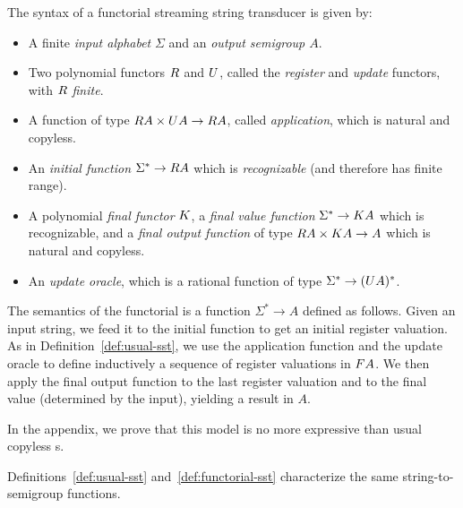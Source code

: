 \begin{definition}\label{def:functorial-sst}
    The syntax of a functorial streaming string transducer is given by:
    \begin{itemize}
        \item A finite \emph{input alphabet} $\Sigma$ and an \emph{output semigroup $A$}.
    \item Two polynomial functors $\functorr$ and $\functoru$, called the \emph{register} and \emph{update} functors, with $\functorr$ \emph{finite}.
    \item A function of type $\functorr A \times \functoru A \to \functorr A$, called \emph{application}, which is natural and copyless.
    \item An \emph{initial function} $\Sigma^* \to \functorr A$ which is
      \emph{recognizable} (and therefore has finite range).
    \item A polynomial \emph{final functor} $\functork$, a \emph{final value function} $\Sigma^* \to \functork A$ which is recognizable, and a \emph{final output function} of type $\functorr A \times \functork A \to A$ which is natural and copyless.
    \item An \emph{update oracle}, which is a rational function of type $\Sigma^* \to (\functoru A)^*$.
    \end{itemize}
\end{definition}
The semantics of the functorial \sst is a function 
$\Sigma^* \to A$ defined as follows. Given an input string, we feed it to the
initial function to get an initial register valuation. As in
Definition~\ref{def:usual-sst}, we use the application function and the update
oracle to define inductively a sequence of register valuations in $\functor A$.
We then apply the final output function to the last register valuation and to the
final value (determined by the input), yielding a result in $A$.

In the appendix, we prove that this model is no more expressive than usual
copyless \sst{}s.

\begin{lemma}\label{lem:functorial-sst-complete}
    Definitions~\ref{def:usual-sst} and~\ref{def:functorial-sst} characterize the same string-to-semigroup functions.
\end{lemma}

